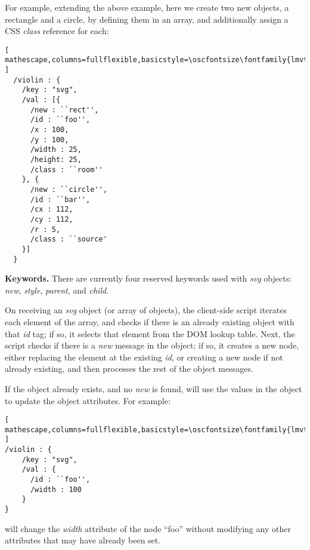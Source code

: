For example, extending the above example, here we create two new objects, a rectangle and a circle, by defining them in an array, and additionally assign a CSS \textit{class} reference for each:

\begin{minipage}{\linewidth}
\begin{lstlisting}[ mathescape,columns=fullflexible,basicstyle=\oscfontsize\fontfamily{lmvtt}\selectfont ]
  /violin : {
    /key : "svg",
    /val : [{
      /new : ``rect'',
      /id : ``foo'',
      /x : 100,
      /y : 100,
      /width : 25,
      /height: 25,
      /class : ``room''
    }, {
      /new : ``circle'',
      /id : ``bar'',
      /cx : 112,
      /cy : 112,
      /r : 5,
      /class : ``source'
    }]
  }
\end{lstlisting}
\end{minipage}


\medskip
\noindent
\textbf{Keywords.} 
There are currently four reserved keywords used with \textit{svg} objects: \textit{new}, \textit{style}, \textit{parent}, and \textit{child}.

On receiving an \textit{svg} object (or array of objects), the client-side script iterates each element of the array, and checks if there is an already existing object with that \textit{id} tag; if so, it selects that element from the DOM lookup table.
Next, the script checks if there is a \textit{new} message in the object; if so, it creates a new node, either replacing the element at the existing \textit{id}, or creating a new node if not already existing, and then processes the rest of the object messages.

If the object already exists, and no \textit{new} is found, \drawsocket will use the values in the object to update the object attributes. For example:

\begin{minipage}{\linewidth}
\begin{lstlisting}[ mathescape,columns=fullflexible,basicstyle=\oscfontsize\fontfamily{lmvtt}\selectfont ]
/violin : {
    /key : "svg",
    /val : {
      /id : ``foo'',
      /width : 100
    }
}
\end{lstlisting}
\end{minipage}

\noindent
will change the \textit{width} attribute of the node ``foo'' without modifying any other attributes that may have already been set.

